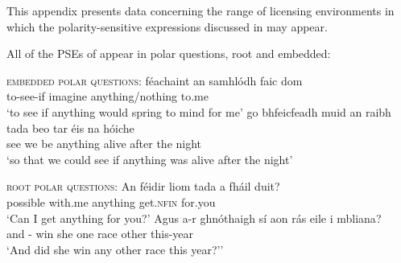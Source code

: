 \documentclass[output=paper,colorlinks,citecolor=brown]{langscibook}
\begin{document}

This appendix presents data concerning the range of licensing environments in which the polarity\hyp sensitive expressions discussed in  may appear.


All of the PSEs of  appear in polar questions, root and embedded:

\ea
\textsc{embedded polar questions}:
\ea
\gll féachaint an samhlódh faic dom \\
     {to-see-if} {\interr} {imagine\imp} anything/nothing {to.me} \\
\glt `to see if anything would spring to mind for me'
\ex
\gll go bhfeicfeadh muid an raibh tada beo {tar éis} na hóiche \\
     {\C} {see\cond} we  {\interr} {be\past} anything alive after the night \\
\glt `so that we could see if anything was alive after the night'
\z
\z
{}


\ea
\textsc{root polar questions}:
\ea
\gll An féidir liom tada {a fháil} duit? \\
     {\interr} possible with.me anything {get.\textsc{nfin}} {for.you} \\
\glt `Can I get anything for you?'
\ex
\gll Agus a-r ghnóthaigh sí aon rás eile {i mbliana}? \\
     and  {\interr-\past}  {win\past} she one race other this-year \\
\glt `And did she win any other race this year?''
\z
\z

\end{document}

